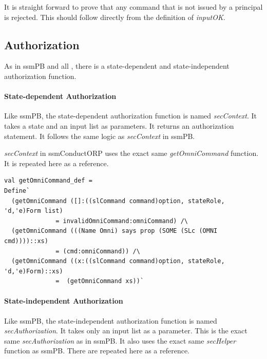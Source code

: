 \documentclass[../../main/main.tex]{subfiles}
\begin{document}
It is straight forward to prove that any command that is not issued by a principal is rejected.  This should follow directly from the definition of \textit{inputOK}.

\HOLssmConductORPTheoremsinputOKXXcmdXXrejectXXlemma


\subsection{Authorization}
As in ssmPB and all , there is a state-dependent and state-independent authorization function.

\paragraph*{State-dependent Authorization}
Like ssmPB, the state-dependent authorization function is named \textit{secContext}.  It takes a state and an input list as parameters.  It returns an authorization statement.  It follows the same logic as \textit{secContext} in ssmPB.

\HOLConductORPDefDefinitionssecContextXXdef

\textit{secContext} in ssmConductORP uses the exact same \textit{getOmniCommand} function. It is repeated here as a reference.



\begin{lstlisting}
val getOmniCommand_def =
Define`
  (getOmniCommand ([]:((slCommand command)option, stateRole, 'd,'e)Form list)
  		      = invalidOmniCommand:omniCommand) /\
  (getOmniCommand (((Name Omni) says prop (SOME (SLc (OMNI cmd))))::xs)
  		      = (cmd:omniCommand)) /\
  (getOmniCommand ((x:((slCommand command)option, stateRole, 'd,'e)Form)::xs)
  		      =  (getOmniCommand xs))`
\end{lstlisting}

\paragraph*{State-independent Authorization}
Like ssmPB, the state-independent authorization function is named \textit{secAuthorization}.  It takes only an input list as a parameter.  This is the exact same \textit{secAuthorization} as in ssmPB. It also uses the exact same \textit{secHelper} function as ssmPB.  There are repeated here as a reference. 
\end{document}
